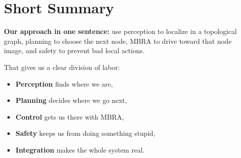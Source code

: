 \documentclass[11pt,a4paper]{article}
\begin{document}
\section{Short Summary}

\begin{mdframed}
\textbf{Our approach in one sentence:} use perception to localize in a
topological graph, planning to choose the next node, MBRA to drive toward that
node image, and safety to prevent bad local actions.
\end{mdframed}

That gives us a clear division of labor:
\begin{itemize}[nosep]
  \item \textbf{Perception} finds where we are,
  \item \textbf{Planning} decides where we go next,
  \item \textbf{Control} gets us there with MBRA,
  \item \textbf{Safety} keeps us from doing something stupid,
  \item \textbf{Integration} makes the whole system real.
\end{itemize}
\end{document}
